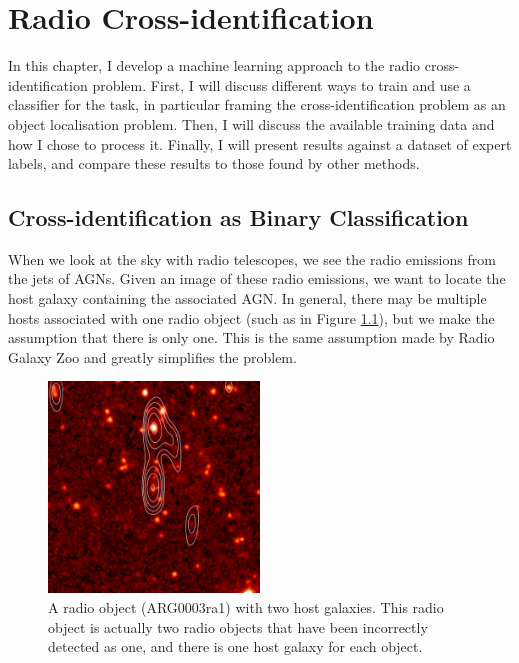 
\chapter{Radio Cross-identification}
\label{cha:passive-learning}

  In this chapter, I develop a machine learning approach to the radio cross-identification problem. First, I will discuss different ways to train and use a classifier for the task, in particular framing the cross-identification problem as an object localisation problem. Then, I will discuss the available training data and how I chose to process it. Finally, I will present results against a dataset of expert labels, and compare these results to those found by other methods.

\section{Cross-identification as Binary Classification}
\label{sec:framing-as-classification}
  
  When we look at the sky with radio telescopes, we see the radio emissions from the jets of AGNs.  Given an image of these radio emissions, we want to locate the host galaxy containing the associated AGN. In general, there may be multiple hosts associated with one radio object (such as in Figure \ref{fig:two-hosts}), but we make the assumption that there is only one. This is the same assumption made by Radio Galaxy Zoo  and greatly simplifies the problem.

  \begin{figure}[!ht]
    \centering
    \includegraphics[width=0.5\textwidth]{images/CI0370C1_heatmap+contours.png}
    \caption{A radio object (ARG0003ra1) with two host galaxies. This radio
      object is actually two radio objects that have been incorrectly detected
      as one, and there is one host galaxy for each object.}
    \label{fig:two-hosts}
  \end{figure}

